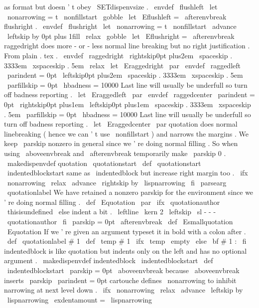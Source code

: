{{{{as
format
but
doesn
'
t
obey
\
SETdispenvsize
.
\
envdef
\
flushleft
{
%
\
let
\
nonarrowing
=
t
%
\
nonfillstart
\
gobble
}
\
let
\
Eflushleft
=
\
afterenvbreak
%
flushright
.
%
\
envdef
\
flushright
{
%
\
let
\
nonarrowing
=
t
%
\
nonfillstart
\
advance
\
leftskip
by
0pt
plus
1fill
\
relax
\
gobble
}
\
let
\
Eflushright
=
\
afterenvbreak
%
raggedright
does
more
-
or
-
less
normal
line
breaking
but
no
right
%
justification
.
From
plain
.
tex
.
\
envdef
\
raggedright
{
%
\
rightskip0pt
plus2em
\
spaceskip
.
3333em
\
xspaceskip
.
5em
\
relax
}
\
let
\
Eraggedright
\
par
\
envdef
\
raggedleft
{
%
\
parindent
=
0pt
\
leftskip0pt
plus2em
\
spaceskip
.
3333em
\
xspaceskip
.
5em
\
parfillskip
=
0pt
\
hbadness
=
10000
%
Last
line
will
usually
be
underfull
so
turn
off
%
badness
reporting
.
}
\
let
\
Eraggedleft
\
par
\
envdef
\
raggedcenter
{
%
\
parindent
=
0pt
\
rightskip0pt
plus1em
\
leftskip0pt
plus1em
\
spaceskip
.
3333em
\
xspaceskip
.
5em
\
parfillskip
=
0pt
\
hbadness
=
10000
%
Last
line
will
usually
be
underfull
so
turn
off
%
badness
reporting
.
}
\
let
\
Eraggedcenter
\
par
%
quotation
does
normal
linebreaking
(
hence
we
can
'
t
use
\
nonfillstart
)
%
and
narrows
the
margins
.
We
keep
\
parskip
nonzero
in
general
since
%
we
'
re
doing
normal
filling
.
So
when
using
\
aboveenvbreak
and
%
\
afterenvbreak
temporarily
make
\
parskip
0
.
%
\
makedispenvdef
{
quotation
}
{
\
quotationstart
}
%
\
def
\
quotationstart
{
%
\
indentedblockstart
%
same
as
\
indentedblock
but
increase
right
margin
too
.
\
ifx
\
nonarrowing
\
relax
\
advance
\
rightskip
by
\
lispnarrowing
\
fi
\
parsearg
\
quotationlabel
}
%
We
have
retained
a
nonzero
parskip
for
the
environment
since
we
'
re
%
doing
normal
filling
.
%
\
def
\
Equotation
{
%
\
par
\
ifx
\
quotationauthor
\
thisisundefined
\
else
%
indent
a
bit
.
\
leftline
{
\
kern
2
\
leftskip
\
sl
-
-
-
\
quotationauthor
}
%
\
fi
{
\
parskip
=
0pt
\
afterenvbreak
}
%
}
\
def
\
Esmallquotation
{
\
Equotation
}
%
If
we
'
re
given
an
argument
typeset
it
in
bold
with
a
colon
after
.
\
def
\
quotationlabel
#
1
{
%
\
def
\
temp
{
#
1
}
%
\
ifx
\
temp
\
empty
\
else
{
\
bf
#
1
:
}
%
\
fi
}
%
indentedblock
is
like
quotation
but
indents
only
on
the
left
and
%
has
no
optional
argument
.
%
\
makedispenvdef
{
indentedblock
}
{
\
indentedblockstart
}
%
\
def
\
indentedblockstart
{
%
{
\
parskip
=
0pt
\
aboveenvbreak
}
%
because
\
aboveenvbreak
inserts
\
parskip
\
parindent
=
0pt
%
%
cartouche
defines
\
nonarrowing
to
inhibit
narrowing
at
next
level
down
.
\
ifx
\
nonarrowing
\
relax
\
advance
\
leftskip
by
\
lispnarrowing
\
exdentamount
=
\
lispnarrowing
}}}}}
